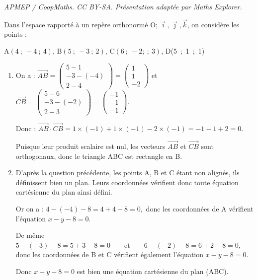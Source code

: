 \documentclass[10pt]{article}
\providecommand{\vect}[1]{\overrightarrow{#1}}
\providecommand{\Oijk}{\(\mathrm{O};\vec{\imath},\vec{\jmath},\vec{k}\)}
\begin{document}
\noindent\textit{APMEP / CoopMaths. CC BY-SA. Présentation adaptée par Maths Explorer.}\par\medskip
\smallskip

Dans l'espace rapporté à un repère orthonormé \Oijk, on considère les points :
\begin{center}
A$(4~;~-4~;~4)$, \quad B$(5~;~-3~;~2)$, \quad C$(6~;~- 2;~;~3)$, \quad D(5~;~1~;~1)
\end{center}

\begin{enumerate}
	\item On a : $\vect{AB} = \begin{pmatrix}5-1\\-3-(-4)\\2-4\end{pmatrix} = \begin{pmatrix}1\\1\\-2\end{pmatrix}$ et $\vect{CB} = \begin{pmatrix}5-6\\-3-(-2)\\2-3\end{pmatrix} = \begin{pmatrix}-1\\-1\\-1\end{pmatrix}$.

Donc :
$\vect{AB} \cdot \vect{CB} = 1 \times (-1) + 1 \times (-1) - 2 \times (-1) = -1 -1 + 2 = 0.$

\smallskip

Puisque leur produit scalaire est nul, les vecteurs $\vect{AB}$ et $\vect{CB}$ sont orthogonaux, donc le triangle ABC est rectangle en B.

	\item D'après la question précédente, les points A, B et C étant non alignés, ils définissent bien un plan. Leurs coordonnées vérifient donc toute équation cartésienne du plan ainsi défini.

Or on a :
$4-(-4)-8 = 4 + 4 - 8 = 0,$
donc les coordonnées de A vérifient l'équation $x - y  - 8 = 0$.
	
De même
$5 - (-3) - 8 = 5 + 3 - 8 = 0 \qquad \text{et} \qquad 6 - (-2) - 8 = 6 + 2 - 8 = 0,$
donc les coordonnées de B et C vérifient également l'équation $x - y - 8 = 0$.

Donc \quad $x - y - 8 = 0$ \quad est bien une équation cartésienne du plan (ABC).


\end{enumerate}
\end{document}
